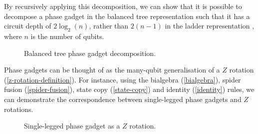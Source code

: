By recursively applying this decomposition, we can show that it is possible to decompose a phase gadget in the balanced tree representation such that it has a circuit depth of $2\log_2(n)$, rather than $2(n-1)$ in the ladder representation \cite{Cowtan2019}, where $n$ is the number of qubits.

\begin{figure}[H]
    \centering
    \caption{Balanced tree phase gadget decomposition.}
    \label{balanced-tree}
\end{figure}


Phase gadgets can be thought of as the many-qubit generalisation of a $Z$ rotation (\ref{z-rotation-definition}). For instance, using the bialgebra (\ref{bialgebra}), spider fusion (\ref{spider-fusion}), state copy (\ref{state-copy}) and identity (\ref{identity}) rules, we can demonstrate the correspondence between single-legged phase gadgets and $Z$ rotations.

\begin{figure}[H]
    \centering
    \caption{Single-legged phase gadget as a $Z$ rotation.}
    \label{phase-gadget-single-leg}
\end{figure}


